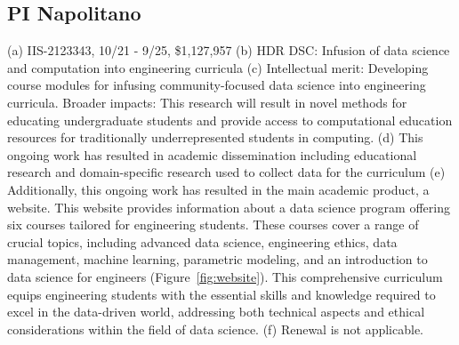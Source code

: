 \documentclass[11pt]{article}
\begin{document}
\subsection{PI Napolitano} (a) IIS-2123343, 10/21 - 9/25, \$1,127,957 (b) HDR DSC: Infusion of data science and computation into engineering curricula (c) Intellectual merit: Developing course modules for infusing community-focused data science into engineering curricula. Broader impacts: This research will result in novel methods for educating undergraduate students and provide access to computational education resources for traditionally underrepresented students in computing. (d) This ongoing work has resulted in academic dissemination including educational research \cite{asdetranslating2023,wfrwnapolitano,rnrncomp} and domain-specific research used to collect data for the curriculum \cite{farnod2022b,
    farnod2023a,
    farnod2022c,
    alam2023a,
    alam2022,
    paulino2021b,
    paulino2022reviver,
    paulino2023automating,
    farnod2022towards,
    paulino2021grammar,
    farnod2023displacement,
    saleem2023analysis,
    alam2023data}
(e) Additionally, this ongoing work has resulted in the main academic product, a website.
This website provides information about a data science program offering six courses tailored for engineering students. These courses cover a range of crucial topics, including advanced data science, engineering ethics, data management, machine learning, parametric modeling, and an introduction to data science for engineers (Figure~\ref{fig:website}). This comprehensive curriculum equips engineering students with the essential skills and knowledge required to excel in the data-driven world, addressing both technical aspects and ethical considerations within the field of data science. (f) Renewal is not applicable. 

\newpage

 
\end{document}
